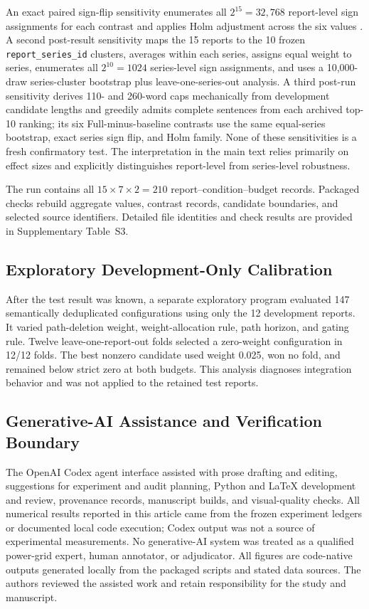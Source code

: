 \documentclass[applsci,article,submit,moreauthors]{Definitions/mdpi}
\begin{document}
An exact paired sign-flip sensitivity enumerates all $2^{15}=32{,}768$ report-level sign assignments for each contrast and applies Holm adjustment across the six values \cite{holm1979simple}. A second post-result sensitivity maps the 15 reports to the 10 frozen \texttt{report\_series\_id} clusters, averages within each series, assigns equal weight to series, enumerates all $2^{10}=1024$ series-level sign assignments, and uses a 10,000-draw series-cluster bootstrap plus leave-one-series-out analysis. A third post-run sensitivity derives 110- and 260-word caps mechanically from development candidate lengths and greedily admits complete sentences from each archived top-10 ranking; its six Full-minus-baseline contrasts use the same equal-series bootstrap, exact series sign flip, and Holm family. None of these sensitivities is a fresh confirmatory test. The interpretation in the main text relies primarily on effect sizes and explicitly distinguishes report-level from series-level robustness.

The run contains all $15\times7\times2=210$ report--condition--budget records. Packaged checks rebuild aggregate values, contrast records, candidate boundaries, and selected source identifiers. Detailed file identities and check results are provided in Supplementary Table~S3.

\subsection{Exploratory Development-Only Calibration}

After the test result was known, a separate exploratory program evaluated 147 semantically deduplicated configurations using only the 12 development reports. It varied path-deletion weight, weight-allocation rule, path horizon, and gating rule. Twelve leave-one-report-out folds selected a zero-weight configuration in 12/12 folds. The best nonzero candidate used weight 0.025, won no fold, and remained below strict zero at both budgets. This analysis diagnoses integration behavior and was not applied to the retained test reports.

\subsection{Generative-AI Assistance and Verification Boundary}

The OpenAI Codex agent interface assisted with prose drafting and editing, suggestions for experiment and audit planning, Python and \LaTeX{} development and review, provenance records, manuscript builds, and visual-quality checks. All numerical results reported in this article came from the frozen experiment ledgers or documented local code execution; Codex output was not a source of experimental measurements. No generative-AI system was treated as a qualified power-grid expert, human annotator, or adjudicator. All figures are code-native outputs generated locally from the packaged scripts and stated data sources. The authors reviewed the assisted work and retain responsibility for the study and manuscript.
\end{document}
